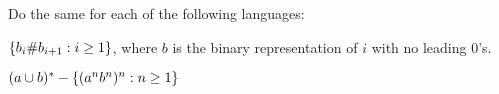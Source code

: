 \begin{problem}
  Do the same for each of the following languages:
  \begin{enumalph}
    \item $\left\{b_i \# b_{i+1} : i \geq 1\right\}$, where $b$ is the binary
      representation of $i$ with no leading $0$'s.
    \item $(a \cup b)^* - \left\{(a^n b^n)^n : n \geq 1\right\}$
  \end{enumalph}
\end{problem}
